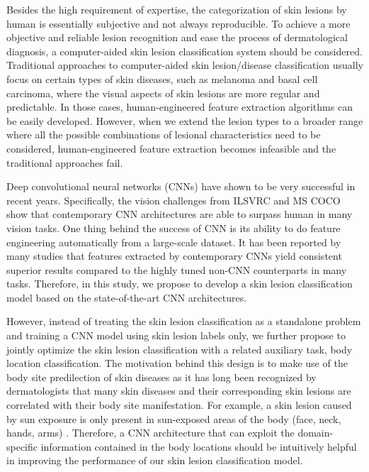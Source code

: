 \documentclass[letterpaper]{article}
\begin{document}
Besides the high requirement of expertise, the categorization of skin lesions by human
is essentially subjective and not always reproducible. To achieve a more objective and
reliable lesion recognition and ease the process of dermatological diagnosis, a
computer-aided skin lesion classification system should be considered.
Traditional approaches to computer-aided skin lesion/disease classification usually
focus on certain types of skin diseases, such as melanoma and basal cell carcinoma,
where the visual aspects of skin lesions are more regular and predictable. In those
cases, human-engineered feature extraction algorithms can be easily developed.
However, when we extend the lesion types to a broader range where all the possible
combinations of lesional characteristics need to be considered, human-engineered feature
extraction becomes infeasible and the traditional approaches fail.

Deep convolutional neural networks (CNNs) have shown to be very successful in recent years.
Specifically, the vision challenges from ILSVRC \cite{DBLP:journals/ijcv/RussakovskyDSKS15}
and MS COCO \cite{DBLP:conf/eccv/LinMBHPRDZ14} show that contemporary CNN
architectures are able to surpass human in many vision tasks. One thing behind
the success of CNN is its ability to do feature engineering automatically
from a large-scale dataset. It has been reported by many studies \cite{DBLP:conf/cvpr/RazavianASC14,DBLP:conf/icml/DonahueJVHZTD14,DBLP:conf/eccv/ZeilerF14,liao2016deep} that features extracted by contemporary
CNNs yield consistent superior results compared to the highly tuned non-CNN counterparts
in many tasks. Therefore, in this study, we propose to develop a skin lesion
classification model based on the state-of-the-art CNN architectures.

However, instead of treating the skin lesion classification as a standalone problem
and training a CNN model using skin lesion labels only, we further propose to
jointly optimize the skin lesion classification with a related auxiliary task,
body location classification. The motivation behind this design is to make use of the
body site predilection of skin diseases \cite{cox2004diagnosis}
as it has long been recognized by dermatologists that many skin diseases and their corresponding
skin lesions are correlated with their body site manifestation. For example, a skin
lesion caused by sun exposure is only present in sun-exposed areas of the body
(face, neck, hands, arms) \cite{cecil2012goldman}. Therefore, a CNN architecture
that can exploit the domain-specific information contained in the body locations
should be intuitively helpful in improving the performance of our skin lesion classification
model.
\end{document}
